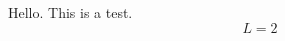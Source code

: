 \documentclass{article}
\begin{document}
Hello. This is a test.
\begin{equation}
L = 2
\end{equation}
\end{document}
